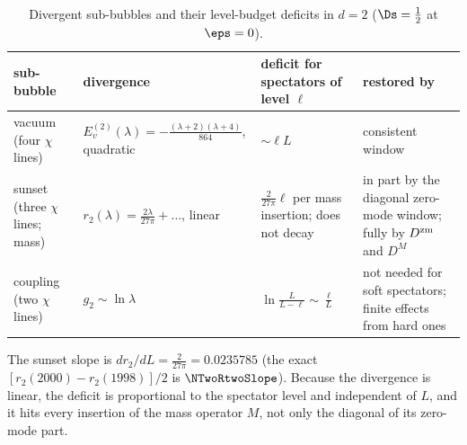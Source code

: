 \begin{table}[ht]
\centering\footnotesize\renewcommand{\arraystretch}{1.15}
\begin{tabular}{@{}p{3.1cm}p{4.3cm}p{3.7cm}p{4.1cm}@{}}
\toprule
sub-bubble & divergence & deficit for spectators of level $\ell$ & restored by \\\midrule
vacuum (four $\chi$ lines) & $E_v^{(2)}(\lambda)=-\frac{(\lambda+2)(\lambda+4)}{864}$, quadratic & ${\sim}\ell L$ & consistent window \\
sunset (three $\chi$ lines; mass) & $r_2(\lambda)=\frac{2\lambda}{27\pi}+\dots$, linear & $\frac2{27\pi}\ell$ per mass insertion; does not decay & in part by the diagonal zero-mode window; fully by $D^{\rm zm}$ and $D^M$ \\
coupling (two $\chi$ lines) & $g_2\sim\ln\lambda$ & $\ln\frac L{L-\ell}\sim\frac\ell L$ & not needed for soft spectators; finite effects from hard ones \\
\bottomrule
\end{tabular}
\caption{Divergent sub-bubbles and their level-budget deficits in $d=2$ ($\Ds=\frac12$ at $\eps=0$).}
\label{d2:tab:budget}
\end{table}

The sunset slope is $dr_2/dL=\frac2{27\pi}=0.0235785$ (the exact $[r_2(2000)-r_2(1998)]/2$ is $\NTwoRtwoSlope$). Because the
divergence is linear, the deficit is proportional to the spectator level and independent of $L$, and it hits every
insertion of the mass operator $M$, not only the diagonal of its zero-mode part.

